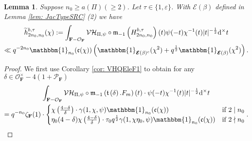 \documentclass[A4]{amsart}
\def\geq{\geqslant}
\newtheorem{lemma}      [theorem]{Lemma}
\numberwithin{equation}{section} \everymath{\displaystyle}
\newcommand{\id}{\mathbbm{1}}
\newcommand{\ud}{\mathrm{d}}
\newcommand{\F}{\mathbf{F}}
\newcommand{\vO}{\mathcal{O}}
\newcommand{\vP}{\mathcal{P}}
\newcommand{\norm}[1][\cdot]{\lvert #1 \rvert}
\newcommand{\Mult}{\mathfrak{m}}
\newcommand{\VorH}{\mathcal{VH}}
\newcommand{\Trans}{\mathfrak{t}}
\newcommand{\cond}{\mathfrak{c}}
\newcommand{\Ecp}{\boldsymbol{\mathcal{E}}}
\begin{document}
\begin{lemma} \label{lem: e1DWt-FineBd3}
	Suppose $n_0 \geq a(\Pi) (\geq 2)$. Let $\tau \in \{ 1, \varepsilon \}$. With $\Ecp(\beta)$ defined in Lemma \ref{lem: JacTypeSRC} (2) we have
\begin{multline*} 
	\widetilde{h}_{2n_0,n_0}^{b,\tau}(\chi) := \int_{\F-\vO_{\F}} \VorH_{\Pi,\psi} \circ \Mult_{-1} \left( H_{2n_0,n_0}^{b,\tau} \right)(t) \psi(-t)\chi^{-1}(t)\norm[t]^{-\frac{1}{2}} \ud^{\times} t \\
	\ll q^{-2n_0} \id_{n_0}(\cond(\chi)) \left( \id_{\Ecp(\beta)^c}(\chi^2) + q^{\frac{1}{2}} \id_{\Ecp(\beta)}(\chi^2) \right).
\end{multline*}
\end{lemma}
\begin{proof}
	We first use Corollary \ref{cor: VHQEleF1} to obtain for any $\delta \in \vO_{\F}^{\times}-4(1+\vP_{\F})$
\begin{multline} \label{eq: DWtQEleF1Trans3}
	\int_{\F-\vO_{\F}} \VorH_{\Pi,\psi} \circ \Mult_{-1} \left( \Trans \left( \delta \right).F_m \right)(t) \cdot \psi(-t) \chi^{-1}(t) \norm[t]^{-\frac{1}{2}} \ud^{\times} t \\
	= q^{-n_0} \zeta_{\F}(1) \cdot \begin{cases}
		\chi \left( \tfrac{4-\delta}{\delta} \right) \cdot \gamma(1,\chi,\psi) \id_{n_0}(\cond(\chi)) & \text{if } 2 \mid n_0 \\
		\eta_0(4-\delta)\chi \left( \tfrac{4-\delta}{\delta} \right) \cdot \tau_0 q^{\frac{1}{2}} \gamma(1,\chi\eta_0,\psi) \id_{n_0}(\cond(\chi)) & \text{if } 2 \nmid n_0
	\end{cases}.
\end{multline}


\end{proof}
\end{document}
